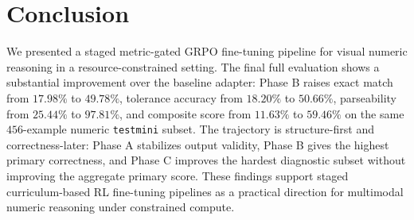 \documentclass{article} %
\begin{document}
\section{Conclusion}

We presented a staged metric-gated GRPO fine-tuning pipeline for visual numeric reasoning in a resource-constrained setting. The final full evaluation shows a substantial improvement over the baseline adapter: Phase B raises exact match from $17.98\%$ to $49.78\%$, tolerance accuracy from $18.20\%$ to $50.66\%$, parseability from $25.44\%$ to $97.81\%$, and composite score from $11.63\%$ to $59.46\%$ on the same $456$-example numeric \texttt{testmini} subset. The trajectory is structure-first and correctness-later: Phase A stabilizes output validity, Phase B gives the highest primary correctness, and Phase C improves the hardest diagnostic subset without improving the aggregate primary score. These findings support staged curriculum-based RL fine-tuning pipelines as a practical direction for multimodal numeric reasoning under constrained compute.



\end{document}
